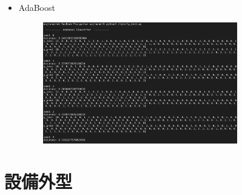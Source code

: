 \begin{itemize}
	\item AdaBoost
	\begin{figure}[H]
		\centering
		\includegraphics[width=0.8\textwidth]{pic/Adaboost.png}
	\end{figure}
\end{itemize}

\section{設備外型}
